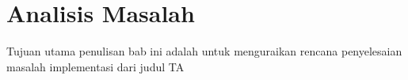 \chapter{Analisis Masalah}
\label{chap:analisis-masalah}

Tujuan utama penulisan bab ini adalah untuk menguraikan rencana penyelesaian masalah implementasi dari judul TA





